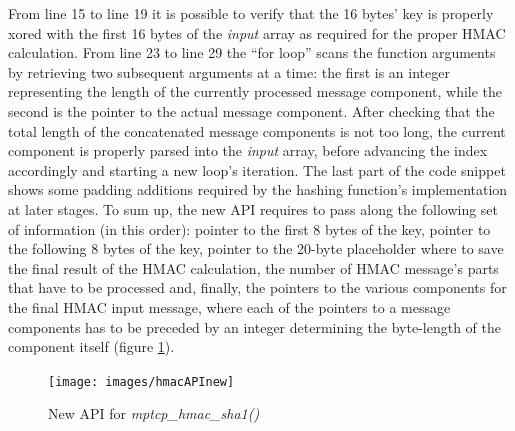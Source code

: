 From line 15 to line 19 it is possible to verify that the 16 bytes' key is properly xored with the first 16 bytes of the \textit{input} array as required for the proper HMAC calculation. From line 23 to line 29 the ``for loop'' scans the function arguments by retrieving two subsequent arguments at a time: the first is an integer representing the length of the currently processed message component, while the second is the pointer to the actual message component. After checking that the total length of the concatenated message components is not too long, the current component is properly parsed into the \textit{input} array, before advancing the index accordingly and starting a new loop's iteration. The last part of the code snippet shows some padding additions required by the hashing function's implementation at later stages.
To sum up, the new API requires to pass along the following set of information (in this order): pointer to the first 8 bytes of the key, pointer to the following 8 bytes of the key, pointer to the 20-byte placeholder where to save the final result of the HMAC calculation, the number of HMAC message's parts that have to be processed and, finally, the pointers to the various components for the final HMAC input message, where each of the pointers to a message components has to be preceded by an integer determining the byte-length of the component itself (figure \ref{fig:hmacAPInew}).

\begin{figure}[!htb]
\centering
\texttt{[image: images/hmacAPInew]}
\caption{New API for \textit{mptcp\_hmac\_sha1()}}
\label{fig:hmacAPInew}
\end{figure}

